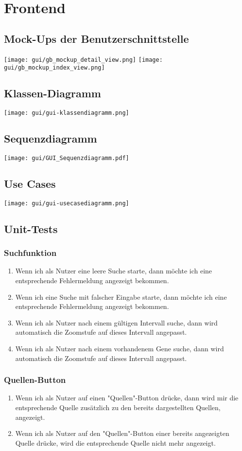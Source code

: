 \documentclass{scrartcl}
\begin{document}
\section{Frontend}
\subsection{Mock-Ups der Benutzerschnittstelle}
\texttt{[image: gui/gb\_mockup\_detail\_view.png]}
\texttt{[image: gui/gb\_mockup\_index\_view.png]}
\subsection{Klassen-Diagramm}
\texttt{[image: gui/gui-klassendiagramm.png]}
\subsection{Sequenzdiagramm}
\texttt{[image: gui/GUI\_Sequenzdiagramm.pdf]}
\subsection{Use Cases}
\texttt{[image: gui/gui-usecasediagramm.png]}
\subsection{Unit-Tests}
\subsubsection{Suchfunktion}
\begin{enumerate}
	\item Wenn ich als Nutzer eine leere Suche starte, dann möchte ich eine entsprechende Fehlermeldung angezeigt bekommen.
	\item Wenn ich eine Suche mit falscher Eingabe starte, dann möchte ich eine entsprechende Fehlermeldung angezeigt bekommen.
	\item Wenn ich als Nutzer nach einem gültigen Intervall suche, dann wird automatisch die Zoomstufe auf dieses Intervall angepasst.
	\item Wenn ich als Nutzer nach einem vorhandenem Gene suche, dann wird automatisch die Zoomstufe auf dieses Intervall angepasst.
\end{enumerate}


\subsubsection{Quellen-Button}
\begin{enumerate}
	\item Wenn ich als Nutzer auf einen "Quellen"-Button drücke, dann wird mir die entsprechende Quelle zusätzlich zu den bereits dargestellten Quellen, angezeigt.
	\item Wenn ich als Nutzer auf den "Quellen"-Button einer bereits angezeigten Quelle drücke, wird die entsprechende Quelle nicht mehr angezeigt.
\end{enumerate}
\end{document}
